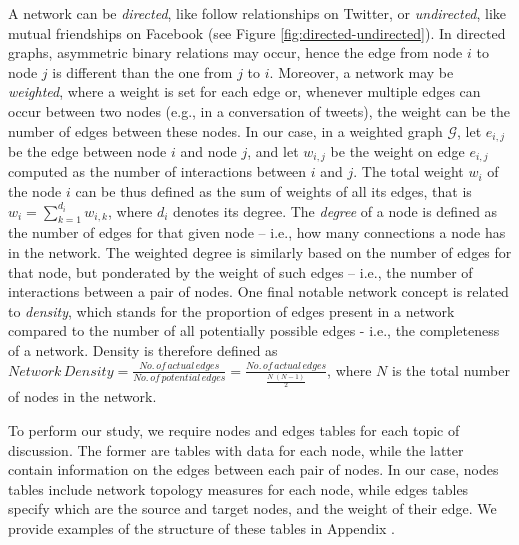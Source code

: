A network can be \textit{directed}, like follow relationships on Twitter, or \textit{undirected}, like mutual friendships on Facebook (see Figure \vref{fig:directed-undirected}). In directed graphs, asymmetric binary relations may occur, hence the edge from node $i$ to node $j$ is different than the one from $j$ to $i$. Moreover, a network may be \textit{weighted}, where a weight is set for each edge or, whenever multiple edges can occur between two nodes (e.g., in a conversation of tweets), the weight can be the number of edges between these nodes.
In our case, in a weighted graph $\mathcal{G}$, let $e_{i,j}$ be the edge between node $i$ and node $j$, and let $w_{i,j}$ be the weight on edge $e_{i,j}$ computed as the number of interactions between $i$ and $j$. The total weight $w_i$ of the node $i$ can be thus defined as the sum of weights of all its edges, that is $w_i = \sum_{k=1}^{d_i} w_{i,k}$, where $d_i$ denotes its degree. The \textit{degree} of a node is defined as the number of edges for that given node – i.e., how many connections a node has in the network. The weighted degree is similarly based on the number of edges for that node, but ponderated by the weight of such edges – i.e., the number of interactions between a pair of nodes.
One final notable network concept is related to \textit{density}, which stands for the proportion of edges present in a network compared to the number of all potentially possible edges - i.e., the completeness of a network. Density is therefore defined as
${Network\, Density = \frac{No.\, of\, actual\, edges}{No.\, of\, potential\, edges} = \frac{No.\, of\, actual\, edges}{\frac{N\; (N-1)}{2}}}$,
where $N$ is the total number of nodes in the network.

To perform our study, we require nodes and edges tables for each topic of discussion. The former are tables with data for each node, while the latter contain information on the edges between each pair of nodes. In our case, nodes tables include network topology measures for each node, while edges tables specify which are the source and target nodes, and the weight of their edge. We provide examples of the structure of these tables in Appendix .

